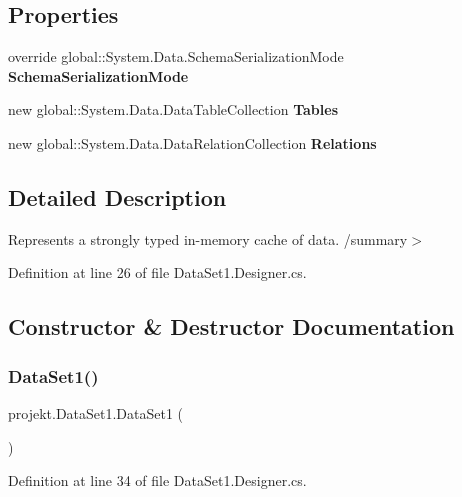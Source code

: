 \subsection*{Properties}
\begin{DoxyCompactItemize}
\item 
override global\+::\+System.\+Data.\+Schema\+Serialization\+Mode \textbf{ Schema\+Serialization\+Mode}\hspace{0.3cm}{\ttfamily  [get, set]}
\item 
new global\+::\+System.\+Data.\+Data\+Table\+Collection \textbf{ Tables}\hspace{0.3cm}{\ttfamily  [get]}
\item 
new global\+::\+System.\+Data.\+Data\+Relation\+Collection \textbf{ Relations}\hspace{0.3cm}{\ttfamily  [get]}
\end{DoxyCompactItemize}


\subsection{Detailed Description}
Represents a strongly typed in-\/memory cache of data. /summary$>$ 

Definition at line 26 of file Data\+Set1.\+Designer.\+cs.



\subsection{Constructor \& Destructor Documentation}
\mbox{\label{classprojekt_1_1DataSet1_ac0a73e3256e3bf1ec8de8dc45615b4b4}} 
\subsubsection{Data\+Set1()\hspace{0.1cm}{\footnotesize\ttfamily [1/2]}}
{\footnotesize\ttfamily projekt.\+Data\+Set1.\+Data\+Set1 (\begin{DoxyParamCaption}{ }\end{DoxyParamCaption})\hspace{0.3cm}{\ttfamily [inline]}}



Definition at line 34 of file Data\+Set1.\+Designer.\+cs.

\mbox{\label{classprojekt_1_1DataSet1_a276b4a5f57cb8de1a39b36dedefe7613}} 
